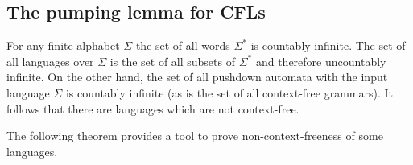 \subsection{The pumping lemma for CFLs}
For any finite alphabet $\Sigma$ the set of all words $\Sigma^*$ is countably infinite.
The set of all languages over $\Sigma$ is the set of all subsets of $\Sigma^*$ and therefore uncountably infinite.
On the other hand, the set of all pushdown automata with the input language $\Sigma$ is countably infinite
(as is the set of all context-free grammars).
It follows that there are languages which are not context-free.

The following theorem provides a tool to prove non-context-freeness of some languages.
